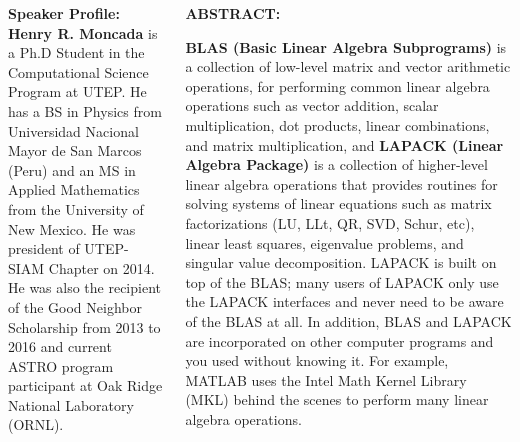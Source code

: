 \documentclass[10pt]{beamer}
\begin{document}
\begin{frame}
\begin{columns}[t]
\begin{column}{.3\textwidth}
\begin{block}
		\vskip-0.2cm
		\scriptsize \textbf{Speaker Profile:} \\
		\vskip0.1cm		
		\justifying \tiny \textbf{Henry R. Moncada} is a Ph.D Student in the Computational Science Program at UTEP. He has a BS in Physics from Universidad Nacional Mayor de San Marcos (Peru) and an MS in Applied Mathematics from the University of New Mexico. He was president of UTEP-SIAM Chapter on 2014.
		He was also the recipient of the Good Neighbor Scholarship from 2013 to 2016 and current ASTRO program participant at Oak Ridge National Laboratory (ORNL).
		\end{block} 
	\end{column}
	\begin{column}{.5\textwidth}

		
		\justifying \scriptsize \textbf{ABSTRACT:}\\	
	\begin{scriptsize}\textbf{BLAS (Basic Linear Algebra Subprograms)} is a collection of low-level matrix and vector arithmetic operations, for performing common linear algebra operations such as vector addition, scalar multiplication, dot products, linear combinations, and matrix multiplication, and \textbf{LAPACK (Linear Algebra Package)} is a collection of higher-level linear algebra operations that provides routines for solving systems of linear equations such as matrix factorizations (LU, LLt, QR, SVD, Schur, etc), linear least squares, eigenvalue problems, and singular value decomposition. LAPACK is built on top of the BLAS; many users of LAPACK only use the LAPACK interfaces and never need to be aware of the BLAS at all. 
	In addition, BLAS and LAPACK are incorporated on other computer programs and you used without knowing it. For example, MATLAB uses the Intel Math Kernel Library (MKL) behind the scenes to perform many linear algebra operations.	\end{scriptsize}
		

\end{column}
\end{columns}
\end{frame}
\end{document}
